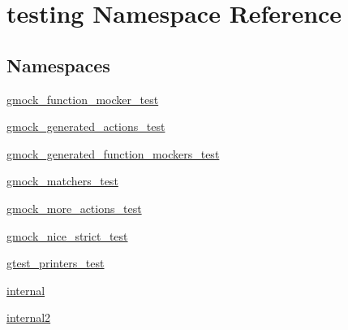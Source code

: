 \hypertarget{namespacetesting}{}\section{testing Namespace Reference}
\label{namespacetesting}
\subsection*{Namespaces}
\begin{DoxyCompactItemize}
\item 
 \mbox{\hyperlink{namespacetesting_1_1gmock__function__mocker__test}{gmock\+\_\+function\+\_\+mocker\+\_\+test}}
\item 
 \mbox{\hyperlink{namespacetesting_1_1gmock__generated__actions__test}{gmock\+\_\+generated\+\_\+actions\+\_\+test}}
\item 
 \mbox{\hyperlink{namespacetesting_1_1gmock__generated__function__mockers__test}{gmock\+\_\+generated\+\_\+function\+\_\+mockers\+\_\+test}}
\item 
 \mbox{\hyperlink{namespacetesting_1_1gmock__matchers__test}{gmock\+\_\+matchers\+\_\+test}}
\item 
 \mbox{\hyperlink{namespacetesting_1_1gmock__more__actions__test}{gmock\+\_\+more\+\_\+actions\+\_\+test}}
\item 
 \mbox{\hyperlink{namespacetesting_1_1gmock__nice__strict__test}{gmock\+\_\+nice\+\_\+strict\+\_\+test}}
\item 
 \mbox{\hyperlink{namespacetesting_1_1gtest__printers__test}{gtest\+\_\+printers\+\_\+test}}
\item 
 \mbox{\hyperlink{namespacetesting_1_1internal}{internal}}
\item 
 \mbox{\hyperlink{namespacetesting_1_1internal2}{internal2}}
\end{DoxyCompactItemize}
